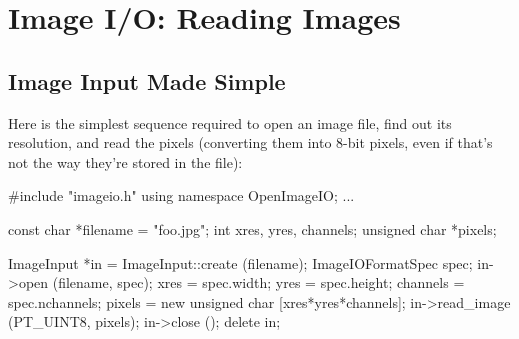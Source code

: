 \chapter{Image I/O: Reading Images}
\label{chap:imageinput}


\section{Image Input Made Simple}
\label{sec:imageinput:simple}

Here is the simplest sequence required to open an image file, find
out its resolution, and read the pixels (converting them into
8-bit pixels, even if that's not the way they're stored in the file):

\begin{code}
    #include "imageio.h"
    using namespace OpenImageIO;
    ...

    const char *filename = "foo.jpg";
    int xres, yres, channels;
    unsigned char *pixels;

    ImageInput *in = ImageInput::create (filename);
    ImageIOFormatSpec spec;
    in->open (filename, spec);
    xres = spec.width;
    yres = spec.height;
    channels = spec.nchannels;
    pixels = new unsigned char [xres*yres*channels];
    in->read_image (PT_UINT8, pixels);
    in->close ();
    delete in;
\end{code}

